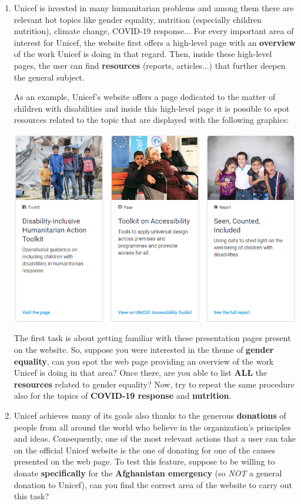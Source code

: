 \documentclass[11pt]{article}
\begin{document}
\begin{Form}
\begin{enumerate}
		\item Unicef is invested in many humanitarian problems and among them there are relevant hot topics like gender equality, nutrition (especially children nutrition), climate change, COVID-19 response... For every important area of interest for Unicef, the website first offers a high-level page with an \textbf{overview} of the work Unicef is doing in that regard. Then, inside these high-level pages, the user can find \textbf{resources} (reports, articles...) that further deepen the general subject.\clearpage
	
		As an example, Unicef's website offers a page dedicated to the matter of children with disabilities and inside this high-level page it is possible to spot resources related to the topic that are displayed with the following graphics:
		\begin{center}
			\includegraphics[width=0.6\linewidth]{res/Resources}
		\end{center}
		
		The first task is about getting familiar with these presentation pages present on the website. So, suppose you were interested in the theme of \textbf{gender equality}, can you spot the web page providing an overview of the work Unicef is doing in that area? Once there, are you able to list \textbf{ALL} the \textbf{resources} related to gender equality?
		Now, try to repeat the same procedure also for the topics of \textbf{COVID-19 response} and \textbf{nutrition}.
		
		\item Unicef achieves many of its goals also thanks to the generous \textbf{donations} of people from all around the world who believe in the organization's principles and ideas. Consequently, one of the most relevant actions that a user can take on the official Unicef website is the one of donating for one of the causes presented on the web page. To test this feature, suppose to be willing to donate \textbf{specifically} for the \textbf{Afghanistan emergency} (so \textit{NOT} a general donation to Unicef), can you find the correct area of the website to carry out this task?
		

\end{enumerate}
\end{Form}
\end{document}
